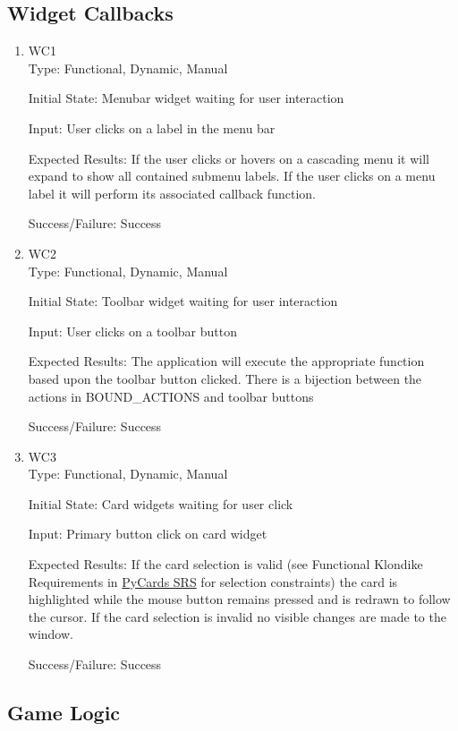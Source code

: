 \documentclass[12pt, titlepage]{article}
\begin{document}
	\subsection{Widget Callbacks}
	\begin{enumerate}
		\item{WC1\\}
		Type: Functional, Dynamic, Manual
		
		Initial State: Menubar widget waiting for user interaction
		
		Input: User clicks on a label in the menu bar
		
		Expected Results: If the user clicks or hovers on a cascading menu it will expand
		to show all contained submenu labels. If the user clicks on a menu label
		it will perform its associated callback function.

		Success/Failure: Success

		\item{WC2\\}
		Type: Functional, Dynamic, Manual
		
		Initial State: Toolbar widget waiting for user interaction
		
		Input: User clicks on a toolbar button
		
		Expected Results: The application will execute the appropriate function based upon
		the toolbar button clicked. There is a bijection between the actions in
		BOUND\_ACTIONS and toolbar buttons

		Success/Failure: Success

		\item{WC3\\}
		Type: Functional, Dynamic, Manual
		
		Initial State: Card widgets waiting for user click
		
		Input: Primary button click on card widget
		
		Expected Results: If the card selection is valid (see Functional Klondike Requirements in 
		\href{https://gitlab.cas.mcmaster.ca/premaa/pysol/tree/master/Doc/SRS}
		{PyCards SRS} for selection constraints) the card is highlighted while the
		mouse button remains pressed and is redrawn to follow the cursor. If the card
		selection is invalid no visible changes are made to the window.

		Success/Failure: Success
	\end{enumerate}
	\subsection{Game Logic}
	
\end{document}
